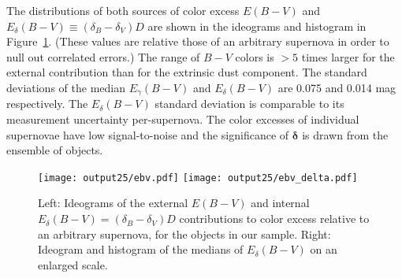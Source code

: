 \documentclass{aastex61}   	%
\begin{document}
The distributions of both sources of color excess $E(B-V)$ and
 $E_\delta(B-V) \equiv   (\delta_B-\delta_V)D$ are shown in the ideograms 
 and histogram in Figure~\ref{ebv:fig}.
 (These values are relative those of an arbitrary supernova in order to null out correlated errors.)
The range of $B-V$ colors is $> 5$ times larger for the external contribution than for the extrinsic dust
component.  
The standard deviations of  the median $E_\gamma(B-V)$ and $E_\delta(B-V)$ are
0.075
and 0.014
mag respectively.
The $E_\delta(B-V)$ standard deviation is comparable to its measurement uncertainty per-supernova.
The color excesses of individual supernovae have low signal-to-noise 
and the significance of $\pmb{\delta}$
is drawn from the ensemble of objects.

\begin{figure}[htbp] %
   \centering
   \texttt{[image: output25/ebv.pdf]}
   \texttt{[image: output25/ebv\_delta.pdf]}
      \caption{Left: Ideograms of the external $E(B-V)$ and
   internal $E_\delta(B-V) = (\delta_B-\delta_V)D$  contributions to color excess relative to an arbitrary supernova, for the objects in our sample.
   Right: Ideogram and histogram of the medians of $E_\delta(B-V)$ on an enlarged scale.
   \label{ebv:fig}}
\end{figure}
\end{document}
